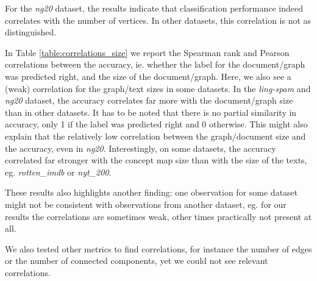 For the \textit{ng20} dataset, the results indicate that classification performance indeed correlates with the number of vertices.
In other datasets, this correlation is not as distinguished.
\fi

In Table \ref{table:correlations_size} we report the Spearman rank and Pearson correlations  \cite{Hauke2011} between the accuracy, ie. whether the label for the document/graph was predicted right, and the size of the document/graph.
Here, we also see a (weak) correlation for the graph/text sizes in some datasets.
In the \textit{ling-spam} and \textit{ng20} dataset, the accuracy correlates far more with the document/graph size than in other datasets.
It has to be noted that there is no partial similarity in accuracy, only 1 if the label was predicted right and 0 otherwise.
This might also explain that the relatively low correlation between the graph/document size and the accuracy, even in \textit{ng20}.
Interestingly, on some datasets, the accuracy correlated far stronger with the concept map size than with the size of the texts, eg. \textit{rotten\_imdb} or \textit{nyt\_200}.

These results also highlights another finding: one observation for some dataset might not be consistent with observations from another dataset, eg. for our results the correlations are sometimes weak, other times practically not present at all.

We also tested other metrics to find correlations, for instance the number of edges or the number of connected components, yet we could not see relevant correlations.

